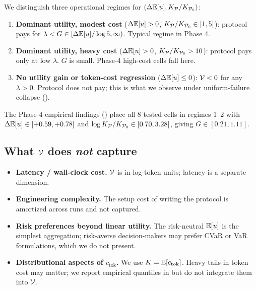 We distinguish three operational regimes for $(\Delta\mathbb{E}[u], K_{\mathcal{P}}/K_{\mathcal{P}_0})$:
\begin{enumerate}[leftmargin=2em]
\item \textbf{Dominant utility, modest cost} ($\Delta\mathbb{E}[u] > 0$, $K_{\mathcal{P}}/K_{\mathcal{P}_0} \in [1, 5]$): protocol pays for $\lambda < G \in [\Delta\mathbb{E}[u] / \log 5, \infty)$. Typical regime in Phase 4.
\item \textbf{Dominant utility, heavy cost} ($\Delta\mathbb{E}[u] > 0$, $K_{\mathcal{P}}/K_{\mathcal{P}_0} > 10$): protocol pays only at low $\lambda$. $G$ is small. Phase-4 high-cost cells fall here.
\item \textbf{No utility gain or token-cost regression} ($\Delta\mathbb{E}[u] \le 0$): $\mathcal{V} < 0$ for any $\lambda > 0$. Protocol does not pay; this is what we observe under uniform-failure collapse ().
\end{enumerate}

The Phase-4 empirical findings () place all $8$ tested cells in regimes 1--2 with $\Delta\mathbb{E}[u] \in [+0.59, +0.78]$ and $\log K_{\mathcal{P}}/K_{\mathcal{P}_0} \in [0.70, 3.28]$, giving $G \in [0.21, 1.11]$.

\subsection{What $\mathcal{V}$ does \emph{not} capture}

\begin{itemize}[leftmargin=2em]
  \item \textbf{Latency / wall-clock cost.} $\mathcal{V}$ is in log-token units; latency is a separate dimension.
  \item \textbf{Engineering complexity.} The setup cost of writing the protocol is amortized across runs and not captured.
  \item \textbf{Risk preferences beyond linear utility.} The risk-neutral $\mathbb{E}[u]$ is the simplest aggregation; risk-averse decision-makers may prefer CVaR or VaR formulations, which we do not present.
  \item \textbf{Distributional aspects of $c_{\mathrm{tok}}$.} We use $K = \mathbb{E}[c_{\mathrm{tok}}]$. Heavy tails in token cost may matter; we report empirical quantiles in  but do not integrate them into $\mathcal{V}$.
\end{itemize}
